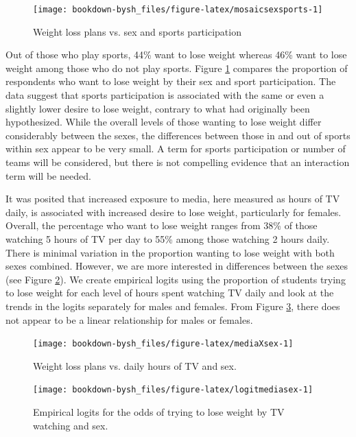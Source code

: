 \documentclass[
]{krantz}
\begin{document}
\begin{figure}

{\centering \texttt{[image: bookdown-bysh\_files/figure-latex/mosaicsexsports-1]} 

}

\caption{Weight loss plans vs. sex and sports participation}\label{fig:mosaicsexsports}
\end{figure}

Out of those who play sports, 44\% want to lose weight whereas 46\% want to lose weight among those who do not play sports. Figure \ref{fig:mosaicsexsports} compares the proportion of respondents who want to lose weight by their sex and sport participation. The data suggest that sports participation is associated with the same or even a slightly lower desire to lose weight, contrary to what had originally been hypothesized. While the overall levels of those wanting to lose weight differ considerably between the sexes, the differences between those in and out of sports within sex appear to be very small. A term for sports participation or number of teams will be considered, but there is not compelling evidence that an interaction term will be needed.

It was posited that increased exposure to media, here measured as hours of TV daily, is associated with increased desire to lose weight, particularly for females. Overall, the percentage who want to lose weight ranges from 38\% of those watching 5 hours of TV per day to 55\% among those watching 2 hours daily. There is minimal variation in the proportion wanting to lose weight with both sexes combined. However, we are more interested in differences between the sexes (see Figure \ref{fig:mediaXsex}). We create empirical logits using the proportion of students trying to lose weight for each level of hours spent watching TV daily and look at the trends in the logits separately for males and females. From Figure \ref{fig:logitmediasex}, there does not appear to be a linear relationship for males or females.

\begin{figure}

{\centering \texttt{[image: bookdown-bysh\_files/figure-latex/mediaXsex-1]} 

}

\caption{Weight loss plans vs. daily hours of TV and sex.}\label{fig:mediaXsex}
\end{figure}

\begin{figure}

{\centering \texttt{[image: bookdown-bysh\_files/figure-latex/logitmediasex-1]} 

}

\caption{Empirical logits for the odds of trying to lose weight by TV watching and sex.}\label{fig:logitmediasex}
\end{figure}
\end{document}
